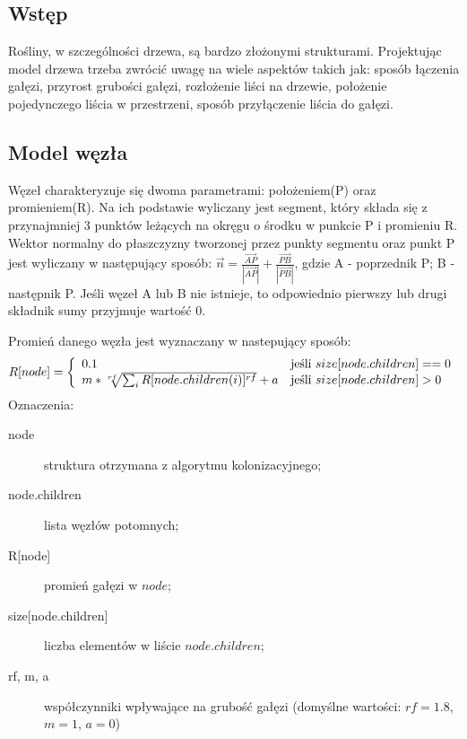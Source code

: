 \subsection{Wstęp}
Rośliny, w szczególności drzewa, są bardzo złożonymi strukturami. Projektując model drzewa trzeba zwrócić uwagę na wiele aspektów takich jak: sposób łączenia gałęzi, przyrost grubości gałęzi, rozłożenie liści na drzewie, położenie pojedynczego liścia w przestrzeni, sposób przyłączenie liścia do gałęzi.


\subsection{Model węzła}

\label{subsec:node_model}

Węzeł charakteryzuje się dwoma parametrami: położeniem(P) oraz promieniem(R). Na ich podstawie wyliczany jest segment, który składa się z przynajmniej 3 punktów leżących na okręgu o środku w punkcie P i promieniu R. Wektor normalny do płaszczyzny tworzonej przez punkty segmentu oraz punkt P jest wyliczany w następujący sposób: $\vec{n}=\frac{\vec{AP}}{|\vec{AP}|}+\frac{\vec{PB}}{|\vec{PB}|}$, gdzie A - poprzednik P; B - następnik P. Jeśli węzeł A lub B nie istnieje, to odpowiednio pierwszy lub drugi składnik sumy przyjmuje wartość 0.

Promień danego węzła jest wyznaczany w nastepujący sposób:
$$
  R[node] = \left\{ 
  \begin{array}{l l}
    0.1 & \textrm{jeśli $size[node.children] == 0$}\\
    m*\sqrt[rf]{\sum_{i} R[node.children(i)]^{rf}}+a & \textrm{jeśli $size[node.children] > 0$}\\
  \end{array} \right.
$$
Oznaczenia:
\begin{description}
	\item[node] struktura otrzymana z algorytmu kolonizacyjnego;
	\item[node.children] lista węzłów potomnych;
	\item[\textrm{R[node]}] promień gałęzi w $node$;
	\item[\textrm{size[node.children]}] liczba elementów w liście $node.children$;
	\item[rf, m, a] współczynniki wpływające na grubość gałęzi (domyślne wartości: $rf=1.8$, $m=1$, $a=0$)
\end{description}

